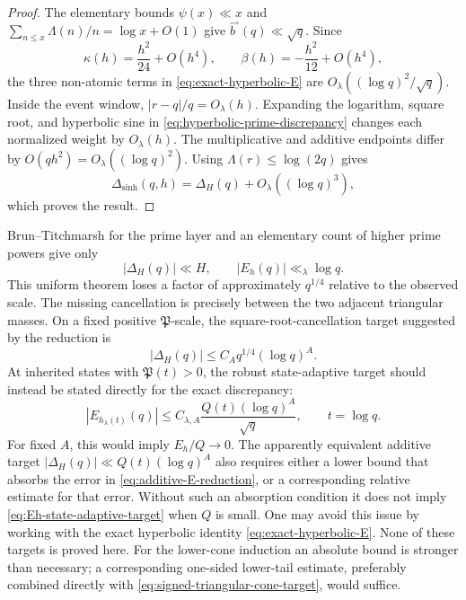 \documentclass[11pt,a4paper]{article}
\numberwithin{equation}{section}
\theoremstyle{definition}
\begin{document}
\begin{proof}
The elementary bounds \(\psi(x)\ll x\) and
\(\sum_{n\le x}\Lambda(n)/n=\log x+O(1)\) give
\(\widehat b^\circ(q)\ll\sqrt q\).  Since
\[
 \kappa(h)=\frac{h^2}{24}+O(h^4),
 \qquad
 \beta(h)=-\frac{h^2}{12}+O(h^4),
\]
the three non-atomic terms in \eqref{eq:exact-hyperbolic-E} are
\(O_\lambda((\log q)^2/\sqrt q)\).  Inside the event window,
\(|r-q|/q=O_\lambda(h)\).  Expanding the logarithm, square root, and
hyperbolic sine in \eqref{eq:hyperbolic-prime-discrepancy} changes each
normalized weight by \(O_\lambda(h)\).  The multiplicative and additive
endpoints differ by \(O(qh^2)=O_\lambda((\log q)^2)\).  Using
\(\Lambda(r)\le\log(2q)\) gives
\[
 \Delta_{\sinh}(q,h)=\Delta_H(q)+O_\lambda((\log q)^3),
\]
which proves the result.
\end{proof}

Brun--Titchmarsh for the prime layer and an elementary count of higher prime
powers give only
\begin{equation}\label{eq:unsigned-E-pointwise}
 |\Delta_H(q)|\ll H,
 \qquad
 |E_h(q)|\ll_\lambda\log q.
\end{equation}
This uniform theorem loses a factor of approximately \(q^{1/4}\) relative
to the observed scale.  The missing cancellation is precisely between the
two adjacent triangular masses.  On a fixed positive \(\mathfrak P\)-scale,
the square-root-cancellation target suggested by the reduction is
\begin{equation}\label{eq:DeltaH-fixed-scale-target}
 |\Delta_H(q)|\le C_A q^{1/4}(\log q)^A.
\end{equation}
At inherited states with \(\mathfrak P(t)>0\), the robust state-adaptive
target should instead be stated directly for the exact discrepancy:
\begin{equation}\label{eq:Eh-state-adaptive-target}
 \boxed{
 |E_{h_\lambda(t)}(q)|
 \le C_{\lambda,A}\frac{Q(t)(\log q)^A}{\sqrt q},
 \qquad t=\log q.
 }
\end{equation}
For fixed \(A\), this would imply \(E_h/Q\to0\).  The apparently equivalent
additive target \(|\Delta_H(q)|\ll Q(t)(\log q)^A\) also requires either a
lower bound that absorbs the error in \eqref{eq:additive-E-reduction}, or a
corresponding relative estimate for that error.  Without such an absorption
condition it does not imply \eqref{eq:Eh-state-adaptive-target} when
\(Q\) is small.  One may avoid this issue by working with the exact
hyperbolic identity \eqref{eq:exact-hyperbolic-E}.  None of these targets is
proved here.  For the lower-cone induction an absolute bound is stronger
than necessary; a corresponding one-sided lower-tail estimate, preferably
combined directly with
\eqref{eq:signed-triangular-cone-target}, would suffice.
\end{document}
